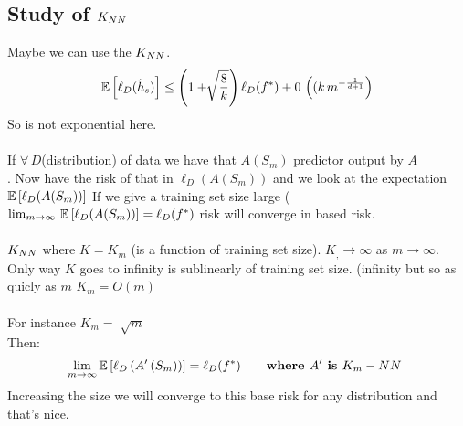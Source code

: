 \documentclass[../main.tex]{subfiles}
\begin{document}
\subsection{Study of $K_{NN}$}
Maybe we can use the $K_{NN}$.
$$
\mathbb{E}\left[ \ell_D(\hat{h}_s)\right] \leq \left( 1+ \sqrt[]{\frac{8}{k}}\right) \ell_D(f^*) + 0 \, \left((k \, m^{-\frac{1}{d+1}}\right)
$$
So is not exponential here.
\\
\\
If $\forall \, D$(distribution) of data we have that $A(S_m)$ predictor output by $A$\\.
Now have the risk of that in $\ell_D(A(S_m))$ and we look at the expectation  $\mathbb{E}\left[\ell_D(A(S_m))\right]$
If we give a training set size large ($\lim_{m \rightarrow \infty} \, \mathbb{E}\left[\ell_D(A(S_m))\right] = \ell_D (f^*)$ risk will converge in based risk.
\\\\
$K_{NN}$ where $K = K_m$ (is a function of training set size).
$K_, \rightarrow \infty $ as $m \rightarrow \infty$.
\\
Only way $K$ goes to infinity is sublinearly of training set size. (infinity but so as quicly as $m$
$K_m = O(m)$
\\\\
For instance $K_m = \sqrt[]{m}$
\\
Then: 
$$
\lim_{m \rightarrow \infty} \mathbb{E} \left[ \ell_D\left(A'\left(S_m\right)\right) \right] = \ell_D(f^*) \qquad \textbf{where $A'$ is $K_m-NN$ } 
$$
Increasing the size we will converge to this base risk for any distribution and that's nice.
\\\\
\end{document}
